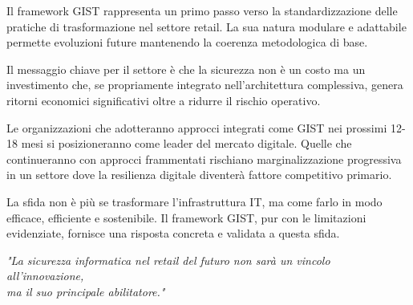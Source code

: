 Il framework GIST rappresenta un primo passo verso la standardizzazione delle pratiche di trasformazione nel settore retail. La sua natura modulare e adattabile permette evoluzioni future mantenendo la coerenza metodologica di base.

Il messaggio chiave per il settore è che la sicurezza non è un costo ma un investimento che, se propriamente integrato nell'architettura complessiva, genera ritorni economici significativi oltre a ridurre il rischio operativo.

Le organizzazioni che adotteranno approcci integrati come GIST nei prossimi 12-18 mesi si posizioneranno come leader del mercato digitale. Quelle che continueranno con approcci frammentati rischiano marginalizzazione progressiva in un settore dove la resilienza digitale diventerà fattore competitivo primario.

La sfida non è più se trasformare l'infrastruttura IT, ma come farlo in modo efficace, efficiente e sostenibile. Il framework GIST, pur con le limitazioni evidenziate, fornisce una risposta concreta e validata a questa sfida.

\vspace{1cm}
\begin{center}
\textit{"La sicurezza informatica nel retail del futuro non sarà un vincolo all'innovazione,\\
ma il suo principale abilitatore."}
\end{center}